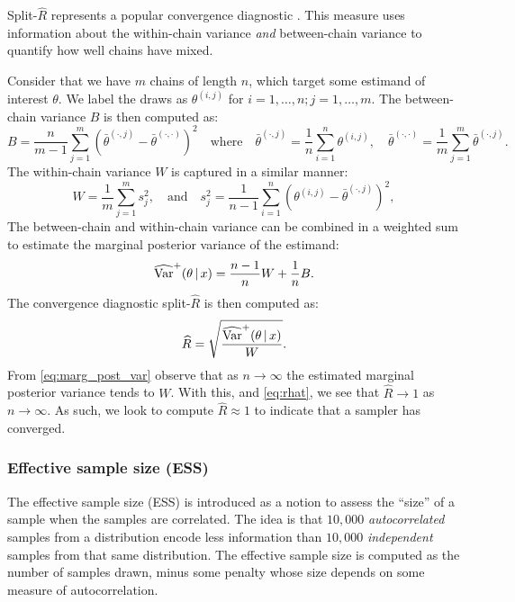 Split-$\widehat{R}$ represents a popular convergence diagnostic
\parencite{gelman13}. This measure uses information about the within-chain
variance \emph{and} between-chain variance to quantify how well chains have
mixed.

Consider that we have $m$ chains of length $n$, which target some estimand of
interest $\theta$. We label the draws as $\theta^{(i, j)}$ for $i=1,\ldots,n;
j=1,\ldots,m$. The between-chain variance $B$ is then computed as:
\begin{equation*}
  B = \frac{n}{m - 1} \sum_{j=1}^m (\bar{\theta}^{(\cdot, j)} - \bar{\theta}^{(\cdot,\cdot)})^2
    \quad \text{where} \quad
    \bar{\theta}^{(\cdot, j)} = \frac{1}{n} \sum_{i=1}^{n} \theta^{(i, j)},
    \quad
    \bar{\theta}^{(\cdot, \cdot)} = \frac{1}{m} \sum_{j=1}^m \bar{\theta}^{(\cdot, j)}.
\end{equation*}
The within-chain variance $W$ is captured in a similar manner:
\begin{equation*}
  W = \frac{1}{m} \sum_{j=1}^m s_j^2,
    \quad \text{and} \quad
    s_j^2 = \frac{1}{n-1} \sum_{i=1}^{n}(\theta^{(i, j)} - \bar{\theta}^{(\cdot,j)})^2,
\end{equation*}
The between-chain and within-chain variance can be combined in a weighted sum
to estimate the marginal posterior variance of the estimand:
\begin{equation}
  \label{eq:marg_post_var}
  \widehat{\text{Var}}^+ (\theta \,|\, x) = \frac{n-1}{n} W + \frac{1}{n} B.
\end{equation}
The convergence diagnostic split-$\widehat{R}$ is then computed as:
\begin{equation}
  \label{eq:rhat}
  \widehat{R} = \sqrt{\frac{\widehat{\text{Var}}^+ (\theta \,|\, x)}{W}}.
\end{equation}
From \cref{eq:marg_post_var} observe that as $n\rightarrow\infty$ the estimated
marginal posterior variance tends to $W$. With this, and \cref{eq:rhat}, we see
that $\widehat{R}\rightarrow1$ as $n\rightarrow\infty$. As such, we look to
compute $\widehat{R}\approx1$ to indicate that a sampler has converged.

\subsubsection{Effective sample size (ESS)}

The effective sample size (ESS) is introduced as a notion to assess the
``size'' of a sample when the samples are correlated. The idea is that $10,000$
\emph{autocorrelated} samples from a distribution encode less information than
$10,000$ \emph{independent} samples from that same distribution. The effective
sample size is computed as the number of samples drawn, minus some penalty
whose size depends on some measure of autocorrelation.

